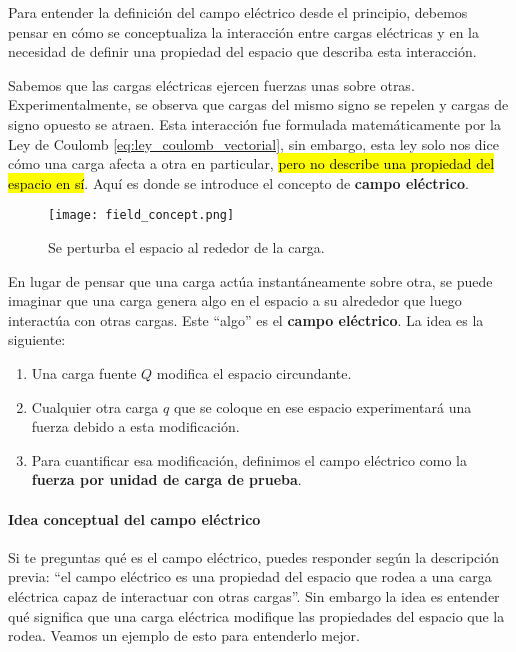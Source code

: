Para entender la definición del campo eléctrico desde el principio, debemos pensar en cómo se conceptualiza la interacción entre cargas eléctricas y en la necesidad de definir una propiedad del espacio que describa esta interacción.

Sabemos que las cargas eléctricas ejercen fuerzas unas sobre otras. Experimentalmente, se observa que cargas del mismo signo se repelen y cargas de signo opuesto se atraen. Esta interacción fue formulada matemáticamente por la Ley de Coulomb \eqref{eq:ley_coulomb_vectorial}, sin embargo, esta ley solo nos dice cómo una carga afecta a otra en particular, \hl{pero no describe una propiedad del espacio en sí}. Aquí es donde se introduce el concepto de \textbf{campo eléctrico}.

\begin{figure}[ht]
    \centering
    \texttt{[image: field\_concept.png]}
    \caption{Se perturba el espacio al rededor de la carga.}
    \label{fig:concepto_campo_electrico}
\end{figure}

En lugar de pensar que una carga actúa instantáneamente sobre otra, se puede imaginar que una carga genera algo en el espacio a su alrededor que luego interactúa con otras cargas. Este ``algo'' es el \textbf{campo eléctrico}. La idea es la siguiente:

\begin{enumerate}
    \item Una carga fuente \( Q \) modifica el espacio circundante.
    \item Cualquier otra carga \( q \) que se coloque en ese espacio experimentará una fuerza debido a esta modificación.
    \item Para cuantificar esa modificación, definimos el campo eléctrico como la \textbf{fuerza por unidad de carga de prueba}.
\end{enumerate}

\paragraph{Idea conceptual del campo eléctrico}

Si te preguntas qué es el campo eléctrico, puedes responder según la descripción previa: ``el campo eléctrico es una propiedad del espacio que rodea a una carga eléctrica capaz de interactuar con otras cargas''. Sin embargo la idea es entender qué significa que una carga eléctrica modifique las propiedades del espacio que la rodea. Veamos un ejemplo de esto para entenderlo mejor.

